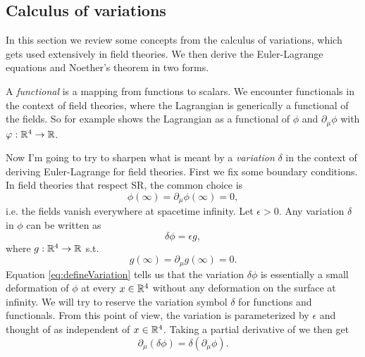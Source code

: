 \subsection{Calculus of variations}\label{sec:variations}

In this section we review some concepts from the calculus of variations, which
gets used extensively in field theories. We then derive the Euler-Lagrange
equations and Noether's theorem in two forms.

A {\it functional} is a mapping from functions to scalars. 
We encounter functionals in the context of field theories,
where the Lagrangian is generically a functional of the fields. So for example 
 shows the Lagrangian as a functional of $\phi$
and $\partial_\mu\phi$ with $\varphi:\mathbb{R}^4\to\mathbb{R}$.

Now I'm going to try to sharpen what is meant by a {\it
variation} $\delta$ in the context of deriving Euler-Lagrange
for field theories. First we fix some boundary conditions. In field theories
that respect SR, the common choice is
\begin{equation}
\phi(\infty)=\partial_\mu\phi(\infty)=0,
\end{equation}
i.e. the fields vanish everywhere at spacetime infinity.
Let $\epsilon>0$.  Any variation $\delta$ in $\phi$ can be written as 
\begin{equation}\label{eq:defineVariation}
\delta\phi=\epsilon g,
\end{equation}
where $g:\mathbb{R}^4\to\mathbb{R}$ s.t.
\begin{equation}
g(\infty)=\partial_\mu g(\infty)=0.
\end{equation}
Equation \eqref{eq:defineVariation} tells us that the variation $\delta\phi$ is
essentially a small deformation of $\phi$ at every $x\in\mathbb{R}^4$ without any
deformation on the  surface at infinity. We will try to reserve
the variation symbol $\delta$ for functions and functionals.
From this point of view, the variation is parameterized by $\epsilon$
and thought of as independent of $x\in\mathbb{R}^4$.
Taking a partial derivative of  we then get
\begin{equation}
\partial_\mu(\delta\phi)
=\delta(\partial_\mu\phi).
\end{equation}

